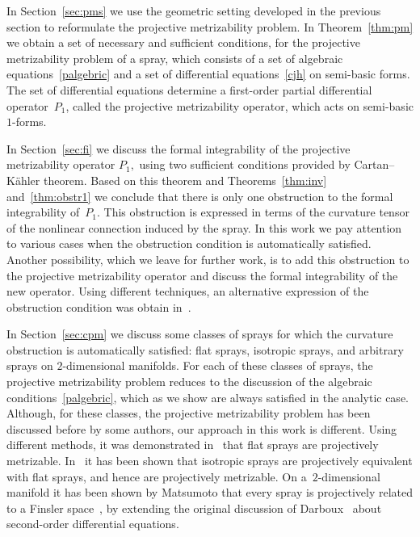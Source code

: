 \documentclass[pdftex]{sigma}
\numberwithin{equation}{section}
\begin{document}
In Section~\ref{sec:pms} we use the geometric setting developed in the
previous section to reformulate the projective metrizability
problem. In Theorem~\ref{thm:pm} we obtain a set of necessary and
suf\/f\/icient conditions, for the projective metrizability problem of a
spray, which consists of a set of algebraic equations~\eqref{palgebric} and
a set of dif\/ferential equations~\eqref{cjh} on semi-basic forms. The
set of dif\/ferential equations determine a f\/irst-order partial dif\/ferential operator~$P_1$, called the
projective metrizability operator, which acts on semi-basic $1$-forms.

In Section~\ref{sec:fi} we discuss the formal integrability of the
projective metrizability operator $P_1,$ using two suf\/f\/icient
conditions provided by Cartan--K\"ahler theorem. Based on this theorem
and Theorems~\ref{thm:inv} and~\ref{thm:obstr1} we conclude that there is only one
obstruction to the formal integrability of~$P_1$. This obstruction is
expressed in terms of the curvature tensor of the nonlinear connection
induced by the spray. In this work we pay attention to various cases when
the obstruction condition is automatically satisf\/ied. Another possibility, which we
leave for further work, is to add this obstruction to the projective
metrizability operator and discuss the formal integrability of the new
operator. Using dif\/ferent techniques, an alternative expression of the obstruction
condition was obtain in~\cite[Theorem 4.9]{szilasi02}.

In Section~\ref{sec:cpm} we discuss some classes of sprays for which the
curvature obstruction is automatically satisf\/ied: f\/lat sprays,
isotropic sprays, and arbitrary sprays on $2$-dimensional
manifolds. For each of these classes of sprays, the projective
metrizability problem reduces to the discussion of the algebraic
conditions~\eqref{palgebric}, which as we show are always
satisf\/ied in the analytic case. Although, for these classes, the projective
metrizability problem has been discussed before by some authors, our
approach in this work is dif\/ferent.
Using dif\/ferent methods, it was demonstrated
in~\cite{crampin07a} that f\/lat sprays are projectively metrizable. In~\cite{crampin07b} it has been shown that isotropic sprays are
projectively equivalent with f\/lat sprays, and hence are projectively metrizable.
On a~$2$-dimensional manifold it has
been shown by Matsumoto that every spray is projectively related to a
Finsler space~\cite{matsumoto95}, by extending the original discussion
of Darboux~\cite{darboux94} about second-order
dif\/ferential equations.
\end{document}
